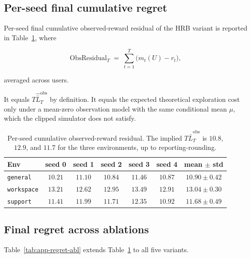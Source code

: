 \documentclass{article} %
\begin{document}
\subsection{Per-seed final cumulative regret}

\label{app:tab-regret}

Per-seed final cumulative observed-reward residual of the \textnormal{HRB}
variant is reported in Table~\ref{tab:app-regret}, where

\begin{equation}
\label{eq:app-tab-regret}
\mathrm{ObsResidual}_T
\;=\;
\sum_{t=1}^T \big(m_t(U)-r_t\big),
\end{equation}

averaged across users.

It equals \(T\widehat{\bar L}_T^{\mathrm{obs}}\) by definition. It equals the
expected theoretical exploration cost only under a mean-zero observation model
with the same conditional mean \(\mu\), which the clipped simulator does not
satisfy.

\begin{table}[h]
\centering
\small
\begin{tabular}{lcccccc}
\toprule
Env & seed 0 & seed 1 & seed 2 & seed 3 & seed 4 & mean $\pm$ std \\
\midrule
\texttt{general}                 & $10.21$ & $11.10$ & $10.84$ & $11.46$ & $10.87$ & $10.90 \pm 0.42$ \\
\texttt{workspace}               & $13.21$ & $12.62$ & $12.95$ & $13.49$ & $12.91$ & $13.04 \pm 0.30$ \\
\texttt{support}                 & $11.41$ & $11.99$ & $11.71$ & $12.35$ & $10.92$ & $11.68 \pm 0.49$ \\
\bottomrule
\end{tabular}
\caption{Per-seed cumulative observed-reward residual. The implied
\(T\widehat{\bar L}_T^{\mathrm{obs}}\) is \(10.8\), \(12.9\), and \(11.7\)
for the three environments, up to reporting-rounding.}
\label{tab:app-regret}
\end{table}

\subsection{Final regret across ablations}

\label{app:tab-regret-ablation}

Table~\ref{tab:app-regret-abl} extends Table~\ref{tab:app-regret} to all five variants.
\end{document}
